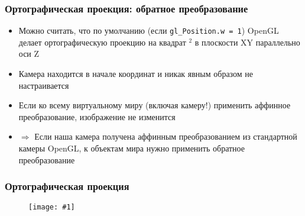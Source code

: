 \documentclass{beamer}
\newcommand{\slideimage}[1]{
  \begin{figure}
    \begin{adjustbox}{width=\textwidth, totalheight=\textheight-2\baselineskip-2\baselineskip,keepaspectratio}
      \texttt{[image: \#1]}
    \end{adjustbox}
  \end{figure}
}
\begin{document}
\begin{frame}[fragile]
\frametitle{Ортографическая проекция: обратное преобразование}
\begin{itemize}
\item Можно считать, что по умолчанию (если \verb|gl_Position.w = 1|) OpenGL делает ортографическую проекцию на квадрат \begin{math}[-1, 1]^2\end{math} в плоскости XY параллельно оси Z
\item Камера находится в начале координат и никак явным образом не настраивается
\pause
\item Если ко всему виртуальному миру (включая камеру!) применить аффинное преобразование, изображение не изменится
\pause
\item \begin{math}\Rightarrow\end{math} Если наша камера получена аффинным преобразованием из стандартной камеры OpenGL, к объектам мира нужно применить обратное преобразование
\end{itemize}
\end{frame}

\begin{frame}[fragile]
\frametitle{Ортографическая проекция}
\slideimage{orthographic.png}
\end{frame}
\end{document}

